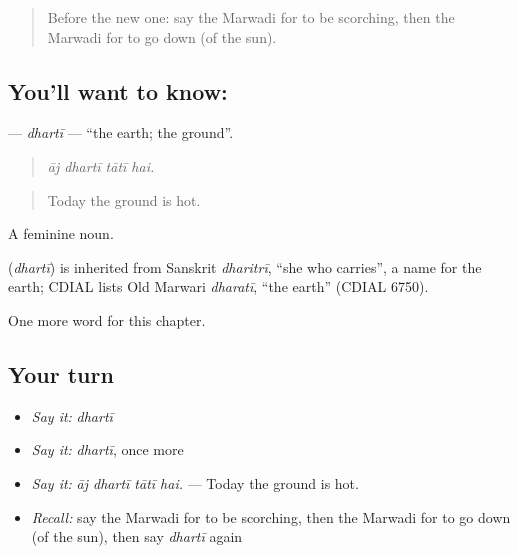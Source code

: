 \label{lesson:MW-C230-dharti}



\begin{quote}
Before the new one: say the Marwadi for to be scorching, then the Marwadi for to go down (of the sun).
\end{quote}

\subsection*{You'll want to know: }
\textbf{} — \emph{dhartī} — \textquotedblleft{}the earth; the ground\textquotedblright{}.

\begin{quote}
   
\end{quote}

\begin{quote}
\emph{āj dhartī tātī hai.}
\end{quote}

\begin{quote}
Today the ground is hot.
\end{quote}

A feminine noun.

\begin{cousinweb}
\textbf{} (\emph{dhartī}) is inherited from Sanskrit \emph{dharitrī}, \textquotedblleft{}she who carries\textquotedblright{}, a name for the earth; CDIAL lists Old Marwari \emph{dharatī}, \textquotedblleft{}the earth\textquotedblright{} (CDIAL 6750).
\end{cousinweb}

\begin{grammarlens}[title={What you've built}]
One more word for this chapter.
\end{grammarlens}

\subsection*{Your turn}
\begin{itemize}
\raggedright
  \item \emph{Say it:} \emph{dhartī}
  \item \emph{Say it:} \emph{dhartī}, once more
  \item \emph{Say it:} \emph{āj dhartī tātī hai.} — Today the ground is hot.
  \item \emph{Recall:} say the Marwadi for to be scorching, then the Marwadi for to go down (of the sun), then say \emph{dhartī} again
\end{itemize}

